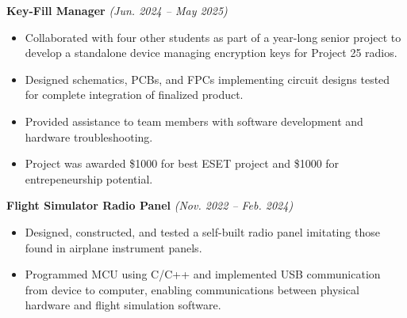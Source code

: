 \documentclass[class=article, crop=false]{standalone}
\begin{document}
\textbf{Key-Fill Manager}
\hfill \textsl{(Jun. 2024 -- May 2025)}
\begin{itemize}[leftmargin=*]
    \item Collaborated with four other students as part of a year-long senior project to 
    develop a standalone device managing encryption keys for Project 25 radios.

    \item Designed schematics, PCBs, and FPCs implementing circuit designs tested 
    for complete integration of finalized product.

    \item Provided assistance to team members with software development and 
    hardware troubleshooting.

    \item Project was awarded \$1000 for best ESET project and \$1000 for entrepeneurship
    potential.
\end{itemize}

\split

\textbf{Flight Simulator Radio Panel}
\hfill \textsl{(Nov. 2022 -- Feb. 2024)}
\begin{itemize}[leftmargin=*]
    \item Designed, constructed, and tested a self-built radio panel imitating those found 
    in airplane instrument panels.

    \item Programmed MCU using C/C++ and implemented USB communication from 
    device to computer, enabling communications between physical hardware
	and flight simulation software.
\end{itemize}
\end{document}
